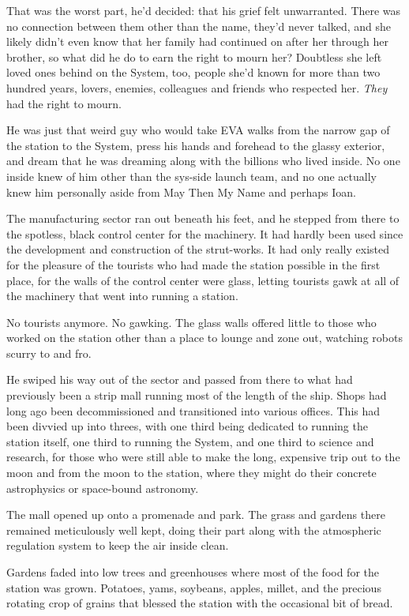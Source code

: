 That was the worst part, he'd decided: that his grief felt unwarranted. There was no connection between them other than the name, they'd never talked, and she likely didn't even know that her family had continued on after her through her brother, so what did he do to earn the right to mourn her? Doubtless she left loved ones behind on the System, too, people she'd known for more than two hundred years, lovers, enemies, colleagues and friends who respected her. \emph{They} had the right to mourn.

He was just that weird guy who would take EVA walks from the narrow gap of the station to the System, press his hands and forehead to the glassy exterior, and dream that he was dreaming along with the billions who lived inside. No one inside knew of him other than the sys-side launch team, and no one actually knew him personally aside from May Then My Name and perhaps Ioan.

The manufacturing sector ran out beneath his feet, and he stepped from there to the spotless, black control center for the machinery. It had hardly been used since the development and construction of the strut-works. It had only really existed for the pleasure of the tourists who had made the station possible in the first place, for the walls of the control center were glass, letting tourists gawk at all of the machinery that went into running a station.

No tourists anymore. No gawking. The glass walls offered little to those who worked on the station other than a place to lounge and zone out, watching robots scurry to and fro.

He swiped his way out of the sector and passed from there to what had previously been a strip mall running most of the length of the ship. Shops had long ago been decommissioned and transitioned into various offices. This had been divvied up into threes, with one third being dedicated to running the station itself, one third to running the System, and one third to science and research, for those who were still able to make the long, expensive trip out to the moon and from the moon to the station, where they might do their concrete astrophysics or space-bound astronomy.

The mall opened up onto a promenade and park. The grass and gardens there remained meticulously well kept, doing their part along with the atmospheric regulation system to keep the air inside clean.

Gardens faded into low trees and greenhouses where most of the food for the station was grown. Potatoes, yams, soybeans, apples, millet, and the precious rotating crop of grains that blessed the station with the occasional bit of bread.

